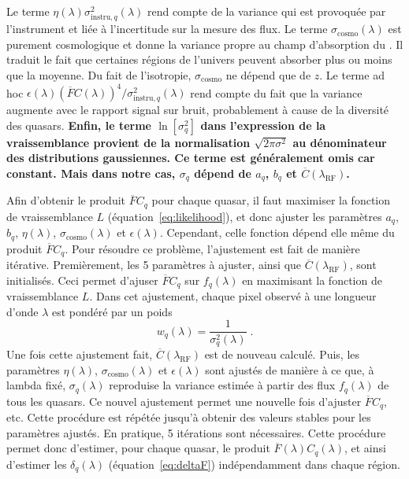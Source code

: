\documentclass[11pt, twoside, a4paper, openright]{report}
\begin{document}
Le terme $\eta(\lambda)\sigma_{\mathrm{instru}, q}^2(\lambda)$ rend compte de la variance qui est provoquée par l'instrument et liée à l'incertitude sur la mesure des flux. Le terme $\sigma_{\mathrm{cosmo}}(\lambda)$ est purement cosmologique et donne la variance propre au champ d'absorption du \lya{}. Il traduit le fait que certaines régions de l'univers peuvent absorber plus ou moins que la moyenne. Du fait de l'isotropie, $\sigma_{\mathrm{cosmo}}$ ne dépend que de $z$. Le terme ad hoc $\epsilon(\lambda)(\overline F C(\lambda))^4 / \sigma_{\mathrm{instru},q}^2 (\lambda)$ rend compte du fait que la variance augmente avec le rapport signal sur bruit, probablement à cause de la diversité des quasars.
\textbf{Enfin, le terme $\ln [\sigma_q^2]$ dans l'expression de la vraissemblance provient de la normalisation $\sqrt{2 \pi \sigma^2}$ au dénominateur des distributions gaussiennes. Ce terme est généralement omis car constant. Mais dans notre cas, $\sigma_q$ dépend de $a_q$, $b_q$ et $\overline C(\lambda_{\mathrm{RF}})$.
}

Afin d'obtenir le produit $\overline F C_q$ pour chaque quasar, il faut maximiser la fonction de vraissemblance $L$ (équation~\ref{eq:likelihood}), et donc ajuster les paramètres $a_q$, $b_q$, $\eta(\lambda)$, $\sigma_{\mathrm{cosmo}}(\lambda)$ et $\epsilon(\lambda)$. Cependant, celle fonction dépend elle même du produit $\overline F C_q$. Pour résoudre ce problème, l'ajustement est fait de manière itérative.
Premièrement, les 5 paramètres à ajuster, ainsi que $\overline C(\lambda_{\mathrm{RF}})$, sont initialisés. Ceci permet d'ajuser $\overline F C_q$ sur $f_q(\lambda)$ en maximisant la fonction de vraissemblance $L$. Dans cet ajustement, chaque pixel observé à une longueur d'onde $\lambda$ est pondéré par un poids
\begin{equation}
  \label{eq:weights}
  w_{q}(\lambda) = \frac{1}{\sigma_{q}^2(\lambda)}  \; .
\end{equation}
Une fois cette ajustement fait, $\overline C(\lambda_{\mathrm{RF}})$ est de nouveau calculé. Puis, les paramètres $\eta(\lambda)$, $\sigma_{\mathrm{cosmo}}(\lambda)$ et $\epsilon(\lambda)$ sont ajustés de manière à ce que, à lambda fixé, $\sigma_q(\lambda)$ reproduise la variance estimée à partir des flux $f_q(\lambda)$ de tous les quasars. Ce nouvel ajustement permet une nouvelle fois d'ajuster $\overline F C_q$, etc. Cette procédure est répétée jusqu'à obtenir des valeurs stables pour les paramètres ajustés. En pratique, 5 itérations sont nécessaires. Cette procédure permet donc d'estimer, pour chaque quasar, le produit $\overline F(\lambda) C_q(\lambda)$, et ainsi d'estimer les $\delta_q(\lambda)$ (équation~\ref{eq:deltaF}) indépendamment dans chaque région.
\end{document}
